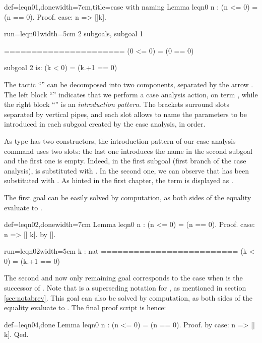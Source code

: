 \begin{coq}{def=leqn01,done}{width=7cm,title=case with naming}
Lemma leqn0 n : (n <= 0) = (n == 0).
Proof.
case: n => [|k].
$~$
$~$
\end{coq}
\begin{coqout}{run=leqn01}{width=5cm}
2 subgoals, subgoal 1

======================
  (0 <= 0) = (0 == 0)

subgoal 2 is:
 (k < 0) = (k.+1 == 0)
\end{coqout}
The tactic ``''  can be decomposed into two components,
separated by the arrow \C{=>}.  The left block ``'' indicates
that we  perform a case analysis action, on term , while the right
block ``\C{[|k]}'' is an \emph{introduction pattern}. The brackets
surround slots separated by vertical pipes, and each slot allows to
name the parameters to be introduced in each subgoal created by the
case analysis, in order.

As type  has two constructors, the introduction pattern \C{[|k]}
of our case analysis command uses two slots: the last one introduces
the name  in the second subgoal and the first one is
empty. Indeed, in the first subgoal (first branch of the case
analysis),  is substituted with . In the second one, we can
observe that  has been substituted with .
As hinted in the first chapter, the term 
is displayed as .

The first goal
can be easily solved by computation, as both sides of the equality
evaluate to .

\begin{coq}{def=leqn02,done}{width=7cm}
Lemma leqn0 n : (n <= 0) = (n == 0).
Proof.
case: n => [| k].
  by [].
\end{coq}
\begin{coqout}{run=leqn02}{width=5cm}
k : nat
=========================
  (k < 0) = (k.+1 == 0)
\end{coqout}
The second and now only remaining goal corresponds to the case when
 is the successor of . Note that  is a
superseding notation for , as mentioned in section
\ref{sec:notabrev}. This goal can also be  solved by computation, as
both sides of the equality evaluate to .  The final
proof script is hence:

\begin{coq}{def=leqn04,done}{}
Lemma leqn0 n : (n <= 0) = (n == 0).
Proof.  by case: n => [| k].  Qed.
\end{coq}
~\\

